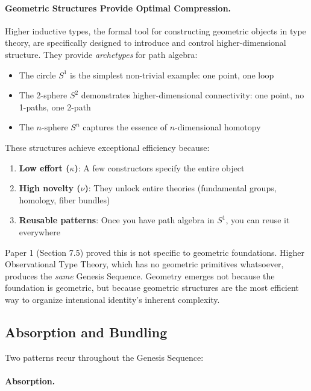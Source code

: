 \documentclass[11pt]{article}
\theoremstyle{definition}
\begin{document}
\paragraph{Geometric Structures Provide Optimal Compression.}

Higher inductive types, the formal tool for constructing geometric objects in type theory, are specifically designed to introduce and control higher-dimensional structure. They provide \emph{archetypes} for path algebra:
\begin{itemize}
\item The circle $S^1$ is the simplest non-trivial example: one point, one loop
\item The 2-sphere $S^2$ demonstrates higher-dimensional connectivity: one point, no 1-paths, one 2-path
\item The $n$-sphere $S^n$ captures the essence of $n$-dimensional homotopy
\end{itemize}

These structures achieve exceptional efficiency because:
\begin{enumerate}
\item \textbf{Low effort ($\kappa$)}: A few constructors specify the entire object
\item \textbf{High novelty ($\nu$)}: They unlock entire theories (fundamental groups, homology, fiber bundles)
\item \textbf{Reusable patterns}: Once you have path algebra in $S^1$, you can reuse it everywhere
\end{enumerate}

Paper 1 (Section 7.5) proved this is not specific to geometric foundations. Higher Observational Type Theory, which has no geometric primitives whatsoever, produces the \emph{same} Genesis Sequence. Geometry emerges not because the foundation is geometric, but because geometric structures are the most efficient way to organize intensional identity's inherent complexity.

\subsection{Absorption and Bundling}

Two patterns recur throughout the Genesis Sequence:

\paragraph{Absorption.}
\end{document}
